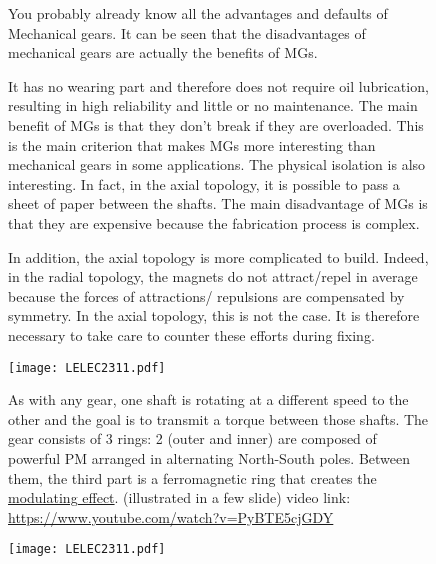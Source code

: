 \begin{figure}[H]
    \begin{minipage}{.45\linewidth}
        
        You probably already know all the advantages and defaults of Mechanical gears.
        It can be seen that the disadvantages of mechanical gears are actually the benefits of MGs.
        
        It has no wearing part and therefore does not require oil lubrication, resulting in high reliability and little or no maintenance. The main benefit of MGs is that they don’t break if they are overloaded. This is the main criterion that makes MGs more interesting than mechanical gears in some applications. The physical isolation is also interesting. In fact, in the axial topology, it is possible to pass a sheet of paper between the shafts. 
        The main disadvantage of MGs is that they are expensive because the fabrication process is complex. 
        
        In addition, the axial topology is more complicated to build. Indeed, in the radial topology, the magnets do not attract/repel in average because the forces of attractions/ repulsions are compensated by symmetry. In the axial topology, this is not the case. It is therefore necessary to take care to counter these efforts during fixing.

    \end{minipage}
    \hfill%
    \begin{minipage}[c]{.45\linewidth}
        \centering
        \texttt{[image: LELEC2311.pdf]}
    
    \end{minipage}
\end{figure}

\begin{figure}[H]
    \begin{minipage}{.45\linewidth}
        As with any gear, one shaft is rotating at a different speed to the other and the goal is to transmit a torque between those shafts. 
        The gear consists of 3 rings:
        2 (outer and inner) are composed of powerful PM arranged in alternating North-South poles. Between them, the third part is a ferromagnetic ring that creates the \underline{ modulating effect}. (illustrated in a few slide)
        video link: \url{https://www.youtube.com/watch?v=PyBTE5cjGDY}
    \end{minipage}
    \hfill%
    \begin{minipage}[c]{.45\linewidth}
        \centering
        \texttt{[image: LELEC2311.pdf]}
    \end{minipage}
\end{figure}

